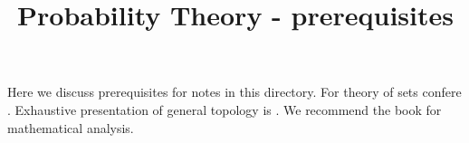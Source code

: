 



\title{Probability Theory - prerequisites}
\date{}
\maketitle
\noindent

Here we discuss prerequisites for notes in this directory. For theory of sets confere \cite{hrbacek1978introduction}. Exhaustive presentation of general topology is \cite{engelking1989general}. We recommend the book \cite{rudin1964principles} for mathematical analysis.






\small


